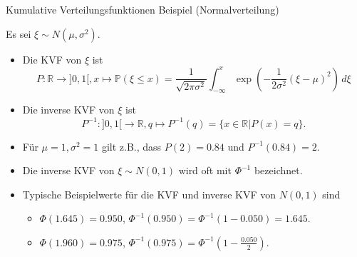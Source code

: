 \documentclass[
  8pt,
  ignorenonframetext,
]{beamer}
\begin{document}
\begin{frame}{Kumulative Verteilungsfunktionen}
\protect\hypertarget{kumulative-verteilungsfunktionen-12}{}
Beispiel (Normalverteilung) \vspace{2mm}

\small
\justifying

Es sei \(\xi \sim N(\mu,\sigma^2)\).

\begin{itemize}
\item Die KVF von $\xi$ ist
\begin{equation}
P : \mathbb{R} \to ]0,1[, x \mapsto \mathbb{P}(\xi \le x)
= \frac{1}{\sqrt{2\pi\sigma^2}}\int_{-\infty}^x\exp\left(-\frac{1}{2\sigma^2}(\xi-\mu)^2\right) \,d\xi
\end{equation}

\item Die inverse KVF von $\xi$ ist
\begin{equation}
P^{-1} : ]0,1[ \to \mathbb{R}, q \mapsto P^{-1}(q) = \{x \in \mathbb{R}|P(x) = q\}.
\end{equation}

\item Für $\mu = 1, \sigma^2 = 1$ gilt z.B., dass $P(2) = 0.84$ und $P^{-1}(0.84) = 2$.

\item Die inverse KVF von $\xi \sim N(0,1)$ wird oft mit $\Phi^{-1}$ bezeichnet.

\item Typische Beispielwerte für die KVF und inverse KVF  von $N(0,1)$ sind
\begin{itemize}
\footnotesize
\item $\Phi(1.645) = 0.950$, $\Phi^{-1}(0.950) = \Phi^{-1}(1 -0.050) = 1.645$.
\item $\Phi(1.960) = 0.975$, $\Phi^{-1}(0.975) = \Phi^{-1}(1 - \frac{0.050}{2})$.

\end{itemize}
\end{itemize}
\end{frame}
\end{document}
